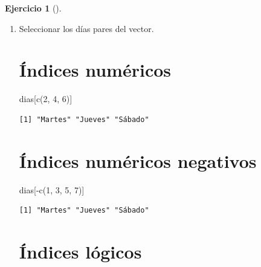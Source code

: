 \documentclass[
  spanish,
  a4paper,
]{scrreport}
\newenvironment{Shaded}{\begin{snugshade}}{\end{snugshade}}
\newcommand{\DecValTok}[1]{\textcolor[rgb]{0.68,0.00,0.00}{#1}}
\newcommand{\FunctionTok}[1]{\textcolor[rgb]{0.28,0.35,0.67}{#1}}
\newcommand{\NormalTok}[1]{\textcolor[rgb]{0.00,0.23,0.31}{#1}}
\newcommand{\SpecialCharTok}[1]{\textcolor[rgb]{0.37,0.37,0.37}{#1}}
\theoremstyle{definition}
\newtheorem{exercise}{Ejercicio}[chapter]
\theoremstyle{remark}
\begin{document}
\begin{exercise}[]
\begin{enumerate}
\begin{tcolorbox}
\begin{verbatim}
[1] "Miércoles"
\end{verbatim}

  \end{tcolorbox}
\item
  Seleccionar los días pares del vector.

  \begin{tcolorbox}[enhanced jigsaw, titlerule=0mm, arc=.35mm, rightrule=.15mm, opacitybacktitle=0.6, leftrule=.75mm, colframe=quarto-callout-tip-color-frame, toptitle=1mm, breakable, colbacktitle=quarto-callout-tip-color!10!white, bottomrule=.15mm, colback=white, left=2mm, bottomtitle=1mm, opacityback=0, title=\textcolor{quarto-callout-tip-color}{\faLightbulb}\hspace{0.5em}{Solución}, toprule=.15mm, coltitle=black]

  \section{Índices numéricos}

\begin{Shaded}
\begin{Highlighting}[]
\NormalTok{dias[}\FunctionTok{c}\NormalTok{(}\DecValTok{2}\NormalTok{, }\DecValTok{4}\NormalTok{, }\DecValTok{6}\NormalTok{)]}
\end{Highlighting}
\end{Shaded}

\begin{verbatim}
[1] "Martes" "Jueves" "Sábado"
\end{verbatim}

  \section{Índices numéricos negativos}

\begin{Shaded}
\begin{Highlighting}[]
\NormalTok{dias[}\SpecialCharTok{{-}}\FunctionTok{c}\NormalTok{(}\DecValTok{1}\NormalTok{, }\DecValTok{3}\NormalTok{, }\DecValTok{5}\NormalTok{, }\DecValTok{7}\NormalTok{)]}
\end{Highlighting}
\end{Shaded}

\begin{verbatim}
[1] "Martes" "Jueves" "Sábado"
\end{verbatim}

  \section{Índices lógicos}


\end{tcolorbox}
\end{enumerate}
\end{exercise}
\end{document}
